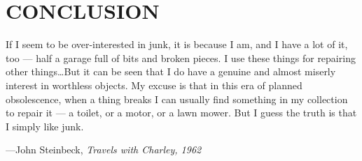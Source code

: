 \chapter{CONCLUSION}



\begin{singlespace}
\epigraph{If I seem to be over-interested in junk, it is because I am, and I have a lot of it, too --- half a garage full of bits and broken pieces. I use these things for repairing other things\ldots But it can be seen that I do have a genuine and almost miserly interest in worthless objects. My excuse is that in this era of planned obsolescence, when a thing breaks I can usually find something in my collection to repair it --- a toilet, or a motor, or a lawn mower. But I guess the truth is that I simply like junk.}{\hfill---John Steinbeck, \textit{Travels with Charley, 1962}}
\end{singlespace}



\lipsum[1-2]
